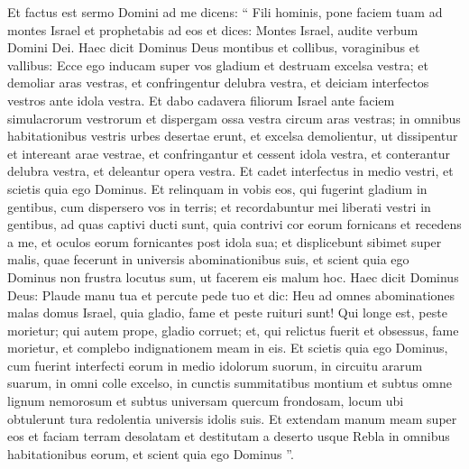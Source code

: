 \begin{biblechapter}
\begin{biblechapter}
\begin{biblechapter}
\begin{biblechapter}
\begin{biblechapter}
\begin{biblechapter}
\verse Et factus est sermo Domini ad me dicens: 
\verse “ Fili hominis, pone faciem tuam ad montes Israel et prophetabis ad eos 
\verse et dices: Montes Israel, audite verbum Domini Dei. Haec dicit Dominus Deus montibus et collibus, voraginibus et vallibus: Ecce ego inducam super vos gladium et destruam excelsa vestra; 
\verse et demoliar aras vestras, et confringentur delubra vestra, et deiciam interfectos vestros ante idola vestra. 
\verse Et dabo cadavera filiorum Israel ante faciem simulacrorum vestrorum et dispergam ossa vestra circum aras vestras; 
\verse in omnibus habitationibus vestris urbes desertae erunt, et excelsa demolientur, ut dissipentur et intereant arae vestrae, et confringantur et cessent idola vestra, et conterantur delubra vestra, et deleantur opera vestra. 
\verse Et cadet interfectus in medio vestri, et scietis quia ego Dominus.
 \verse Et relinquam in vobis eos, qui fugerint gladium in gentibus, cum dispersero vos in terris; 
\verse et recordabuntur mei liberati vestri in gentibus, ad quas captivi ducti sunt, quia contrivi cor eorum fornicans et recedens a me, et oculos eorum fornicantes post idola sua; et displicebunt sibimet super malis, quae fecerunt in universis abominationibus suis, 
\verse et scient quia ego Dominus non frustra locutus sum, ut facerem eis malum hoc.
 \verse Haec dicit Dominus Deus: Plaude manu tua et percute pede tuo et dic: Heu ad omnes abominationes malas domus Israel, quia gladio, fame et peste ruituri sunt! 
\verse Qui longe est, peste morietur; qui autem prope, gladio corruet; et, qui relictus fuerit et obsessus, fame morietur, et complebo indignationem meam in eis. 
\verse Et scietis quia ego Dominus, cum fuerint interfecti eorum in medio idolorum suorum, in circuitu ararum suarum, in omni colle excelso, in cunctis summitatibus montium et subtus omne lignum nemorosum et subtus universam quercum frondosam, locum ubi obtulerunt tura redolentia universis idolis suis. 
\verse Et extendam manum meam super eos et faciam terram desolatam et destitutam a deserto usque Rebla in omnibus habitationibus eorum, et scient quia ego Dominus ”.
 

\end{biblechapter}
\end{biblechapter}
\end{biblechapter}
\end{biblechapter}
\end{biblechapter}
\end{biblechapter}
